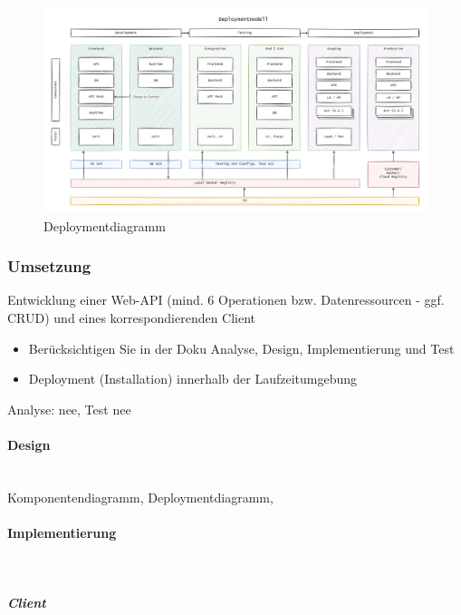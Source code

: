 \documentclass[notitlepage, hidelinks]{article}
\begin{document}
\begin{figure}[H]
\centering
  \includegraphics[width=\textwidth]{images/deployment.png}
  \caption{Deploymentdiagramm}
  \label{fig:deploymentdiagramm}
\end{figure}


\subsubsection{Umsetzung}
Entwicklung einer Web-API (mind. 6 Operationen bzw. Datenressourcen - ggf. CRUD) und eines korrespondierenden Client
\begin{itemize}
\item Berücksichtigen Sie in der Doku Analyse, Design, Implementierung und Test
\item Deployment (Installation) innerhalb der Laufzeitumgebung
\end{itemize}

Analyse: nee, Test nee

\paragraph{Design} \mbox{} \\
Komponentendiagramm, Deploymentdiagramm, 

\paragraph{Implementierung} \mbox{} \\

\subparagraph{Client} \mbox{} \\
\end{document}
